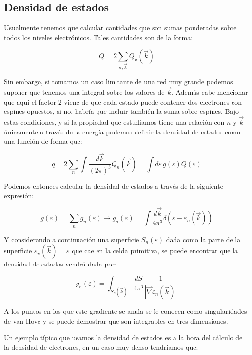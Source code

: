 \documentclass{article} %
\begin{document}
\subsection{Densidad de estados}

Usualmente tenemos que calcular cantidades que son sumas ponderadas sobre todos los niveles electrónicos. Tales cantidades son de la forma:

$$
Q = 2\sum_{n,\vec{k}}Q_n(\vec{k})
$$

Sin embargo, si tomamos un caso limitante de una red muy grande podemos suponer que tenemos una integral sobre los valores de $\vec{k}$. Además cabe mencionar que aquí el factor 2 viene de que cada estado puede contener dos electrones con espines opuestos, si no, habría que incluir también la suma sobre espines. Bajo estas condiciones, y si la propiedad que estudiamos tiene una relación con $n$ y $\vec{k}$ únicamente a través de la energía podemos definir la densidad de estados como una función de forma que:

\begin{equation}
q = 2\sum_n \int \frac{d\vec{k}}{(2\pi)^3}Q_n(\vec{k}) = \int d\varepsilon \, g(\varepsilon) Q(\varepsilon)
\end{equation}

Podemos entonces calcular la densidad de estados a través de la siguiente expresión:

\begin{equation}
g(\varepsilon) = \sum_n g_n(\varepsilon) \rightarrow g_n(\varepsilon) = \int \frac{d\vec{k}}{4\pi^3}\delta(\varepsilon - \varepsilon_n(\vec{k}))
\end{equation}

Y considerando a continuación una superficie $S_n(\varepsilon)$ dada como la parte de la superficie $\varepsilon_n(\vec{k}) = \varepsilon$ que cae en la celda primitiva, se puede encontrar que la densidad de estados vendrá dada por:

\begin{equation}
g_n(\varepsilon) = \int_{S_n(\vec{k})} \frac{dS}{4\pi^3}\frac{1}{|\vec{\nabla}\varepsilon_n(\vec{k})|}
\end{equation}

A los puntos en los que este gradiente se anula se le conocen como singularidades de van Hove y se puede demostrar que son integrables en tres dimensiones.

Un ejemplo típico que usamos la densidad de estados es a la hora del cálculo de la densidad de electrones, en un caso muy denso tendríamos que:
\end{document}
